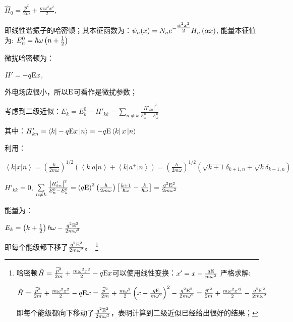 \begin{center}
$\hat H_0  = \frac{{\widehat p^2 }}{{2m}} + \frac{{m\omega ^2 x^2 }}{2}$,
\end{center}


即线性谐振子的哈密顿；其本征函数为：$\psi _n (x) = N_n e^{ - {\textstyle{{\alpha ^2 x^2 } \over 2}}} H_n \left( {\alpha x} \right)$, 能量本征值为: $E_n^0  = \hbar \omega \left( {n + {\textstyle{1 \over 2}}} \right)$

微扰哈密顿为：

\begin{center}
$H' =  - q{\rm E}x$,
\end{center}

外电场应很小，所以${\rm E}$可看作是微扰参数；

考虑到二级近似：$E_k  = E_k^0  + H'_{kk}  - \sum\limits_{n \ne k} {\frac{{\left| {H'_{kn} } \right|^2 }}{{E_n^0  - E_k^0 }}} $

其中：$H'_{kn}  = \left\langle k \right| - q{\rm E}x\left| n \right\rangle  =  - q{\rm E}\left\langle k \right|x\left| n \right\rangle $

利用：

\begin{center}
$\left\langle k \right|x\left| n \right\rangle  = \left( {\frac{\hbar }{{2m\omega }}} \right)^{1/2} \left( {\left\langle k \right|a\left| n \right\rangle  + \left\langle k \right|a^ +  \left| n \right\rangle } \right) = \left( {\frac{\hbar }{{2m\omega }}} \right)^{1/2} \left( {\sqrt {k + 1} \delta _{k + 1,n}  + \sqrt k \delta _{k - 1,n} } \right)$
\end{center}

$H'_{kk}  = 0$, $\sum\limits_{n \ne k} {\frac{{\left| {H'_{kn} } \right|^2 }}{{E_n^0  - E_k^0 }}}  = \left( {q{\rm E}} \right)^2 \left( {\frac{\hbar }{{2m\omega }}} \right)\left[ {\frac{{k + 1}}{{\hbar \omega }} - \frac{k}{{\hbar \omega }}} \right] = \frac{{q^2 {\rm E}^2 }}{{2m\omega ^2 }}$

能量为：

\begin{center}
$E_k  = \left( {k + {\textstyle{1 \over 2}}} \right)\hbar \omega  - \frac{{q^2 {\rm E}^2 }}{{2m\omega ^2 }}$
\end{center}

即每个能级都下移了$\frac{{q^2 {\rm E}^2 }}{{2m\omega ^2 }}$。~\footnote{哈密顿$\hat H = \frac{{\widehat p^2 }}{{2m}} + \frac{{m\omega ^2 x^2 }}{2} - q{\rm E}x$可以使用线性变换：$x' = x - \frac{{q{\rm E}}}{{m\omega ^2 }}$
严格求解:

$\hat H = \frac{{\widehat p^2 }}{{2m}} + \frac{{m\omega ^2 x^2 }}{2} - q{\rm E}x = \frac{{\widehat p^2 }}{{2m}} + \frac{{m\omega ^2 }}{2}\left( {x - \frac{{q{\rm E}}}{{m\omega ^2 }}} \right)^2  - \frac{{q^2 {\rm E}^2 }}{{2m\omega ^2 }} = \frac{{\hat p'^2 }}{{2m}} + \frac{{m\omega ^2 x'^2 }}{2} - \frac{{q^2 {\rm E}^2 }}{{2m\omega ^2 }}$

即每个能级都向下移动了$\frac{{q^2 {\rm E}^2 }}{{2m\omega ^2 }}$，表明计算到二级近似已经给出很好的结果；}


